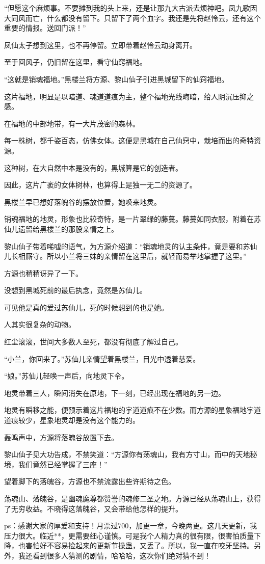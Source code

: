 \begin{this_body}
“但愿这个麻烦事。不要摊到我的头上来，还是让那九大古派去烦神吧。凤九歌因大同风而亡，什么都没有留下。只留下了两个血字。我还是先将赵怜云，还有这个重要的情报。送回门派！”

凤仙太子想到这里，也不再停留。立即带着赵怜云动身离开。

至于回风子，仍旧留在这里，看守仙窍福地。

“这就是销魂福地。”黑楼兰将方源、黎山仙子引进黑城留下的仙窍福地。

这片福地，明显是以暗道、魂道道痕为主，整个福地光线晦暗，给人阴沉压抑之感。

在福地的中部地带，有一大片茂密的森林。

每一株树，都千姿百态，仿佛女体。这便是黑城在自己仙窍中，栽培而出的奇特资源。

这种树，在大自然中本是没有的，黑城算是它的创造者。

因此，这片广袤的女体树林，也算得上是独一无二的资源了。

黑楼兰早已想好落魄谷的摆放位置，她唤来地灵。

销魂福地的地灵，形象也比较奇特，是一片翠绿的藤蔓。藤蔓如同衣服，附着在苏仙儿遗留给黑楼兰的那股亲情之上。

黎山仙子带着唏嘘的语气，为方源介绍道：“销魂地灵的认主条件，竟是要和苏仙儿长相厮守。所以小兰将三妹的亲情留在这里后，就轻而易举地掌握了这里。”

方源也稍稍讶异了一下。

没想到黑城死前的最后执念，竟然是苏仙儿。

可见他是真的爱过苏仙儿，死的时候想到的也是她。

人其实很复杂的动物。

红尘滚滚，世间大多数人至死，都没有彻底了解过自己。

“小兰，你回来了。”苏仙儿亲情望着黑楼兰，目光中透着慈爱。

“娘。”苏仙儿轻唤一声后，向地灵下令。

地灵带着三人，瞬间消失在原地，下一刻，已经出现在福地的另一边。

地灵有瞬移之能，便预示着这片福地的宇道道痕不在少数。而方源的星象福地宇道道痕较少，星象地灵却是没有这个能力的。

轰鸣声中，方源将落魄谷放置下去。

黎山仙子见大功告成，不禁笑道：“方源你有荡魂山，我有方寸山，而中的天地秘境，我们竟然已经掌握了三座！”

望着脚下的落魄谷，方源也不禁流露出些许期待之色。

荡魂山、落魄谷，是幽魂魔尊都赞誉的魂修二圣之地。方源已经从荡魂山上，获得了无穷收益。不晓得这落魄谷，又会带给他怎样的提升。

ps：感谢大家的厚爱和支持！月票过700，加更一章，今晚两更。这几天更新，我压力很大。临近**，更需要细心谨慎。可是我个人精力真的很有限，很害怕质量下降，也害怕好不容易捡起来的更新节操蛊，又丢了。所以，我一直在咬牙坚持。另外，我还看到很多人猜测的剧情，哈哈哈，这次你们绝对猜不到！

\end{this_body}

